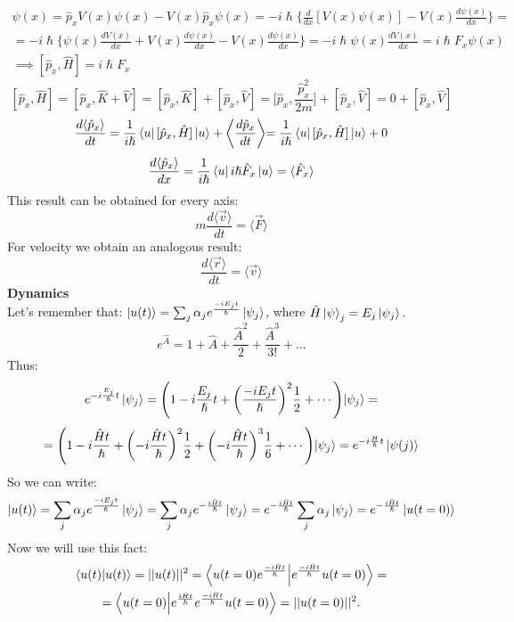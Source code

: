 \documentclass{article}
\begin{document}
\begin{gather*}
 [ \hat{p}_x, V ] \psi(x) = \hat{p}_x V(x) \psi(x) - V(x)\hat{p}_x \psi(x) = -i \hslash  \biggl\{ \frac{d}{dx} [V(x)\psi(x)] - V(x) \frac{d\psi(x)}{dx} \biggl\} = \\ = -i \hslash  \biggl\{ \psi(x) \frac{dV(x)}{dx}+ V(x) \frac{d\psi(x)}{dx} - V(x) \frac{d\psi(x)}{dx} \biggl\} = - i \hslash \psi(x) \frac{dV(x)}{dx}   = i \hslash F_x \psi(x)  \\ \implies [\hat{p}_x,\hat{H}] = i \hslash F_x
\end{gather*}
$$[\hat{p}_x,\hat{H}] = [\hat{p}_x, \hat{K} + \hat{V}] = [ \hat{p}_x, \hat{K} ] + [ \hat{p}_x, \hat{V} ] = \biggl[\hat{p}_x, \frac{\hat{p}_x^2}{2m} \biggl] +   [ \hat{p}_x, \hat{V} ] = 0 +  [ \hat{p}_x, \hat{V} ]  $$
$$\frac{d\langle \hat{p}_x \rangle}{dt} = \frac{1}{i\hslash} \bra{u} [\hat{p}_x,\hat{H}] \ket{u} + \biggl\langle \frac{d\hat{p}_x}{dt} \biggl\rangle = \frac{1}{i\hslash} \bra{u} [\hat{p}_x,\hat{H}] \ket{u} + 0$$
$$\frac{d\langle \hat{p}_x \rangle}{dx} = \frac{1}{i \hslash} \bra{u} i \hslash \hat{F}_x \ket{u} = \langle \hat{F}_x \rangle $$
This result can be obtained for every axis:
$$m \frac{d\langle \vec{v} \rangle }{dt} = \langle \vec{F} \rangle  $$
For velocity we obtain an analogous result:
$$ \frac{d\langle \vec{r} \rangle }{dt} = \langle \vec{v} \rangle  $$
\textbf{Dynamics} \\ 
Let's remember that: $\ket{u(t)} = \sum_j \alpha_j e^{\frac{-i E_j t}{\hslash}} \ket{\psi_j} $,  where $\hat{H} \ket{\psi}_j = E_j \ket{\psi_j}.$
$$e^{\hat{A}} = 1 + \hat{A} + \frac{\hat{A}^2}{2} + \frac{\hat{A}^3}{3!}+... $$
Thus:$$ $$
$$e^{-i\frac{E_j}{\hslash}t}\ket{\psi_j} =\Biggl(1-i\frac{E_j}{\hslash}t+\biggl(\frac{-iE_jt}{\hslash}\biggl)^2 \frac{1}{2}  + \cdots \Biggl) \ket{\psi_j} =$$
$$= \Biggl( 1-i\frac{\hat{H}t}{\hslash}+ \biggl( -i \frac{\hat{H}t}{\hslash}\biggl)^2 \frac{1}{2}+ \biggl( -i \frac{\hat{H}t}{\hslash}\biggl)^3\frac{1}{6}+ \cdots \Biggl) \ket{\psi_j}=e^{-i\frac{\hat{H}}{\hslash}t}\ket{\psi(j)}$$
So we can write:
$$\ket{u(t)} = \sum_j \alpha_j e^{\frac{-i E_j t}{\hslash}} \ket{\psi_j} = \sum_j \alpha_j e^{-\frac{i \hat{H}t}{\hslash}} \ket{\psi_j} =  e^{-\frac{i \hat{H}t}{\hslash}} \sum_j \alpha_j \ket{\psi_j} = e^{-\frac{i \hat{H}t}{\hslash}} \ket{u(t=0)}  $$
Now we will use this fact:
\begin{gather*}
    \bra{u(t)} \ket{u(t)} = ||u(t)||^2 = \bra{u(t=0) e^{\frac{-i\hat{H}t}{\hslash}}}  \ket{e^{\frac{-i\hat{H}t}{\hslash}} u(t=0)} =  \\ = \bra{u(t=0) }  \ket{e^{\frac{i\hat{H}t}{\hslash}}e^{\frac{-i\hat{H}t}{\hslash}} u(t=0)} = ||u(t=0)||^2.
\end{gather*} \\
\end{document}
